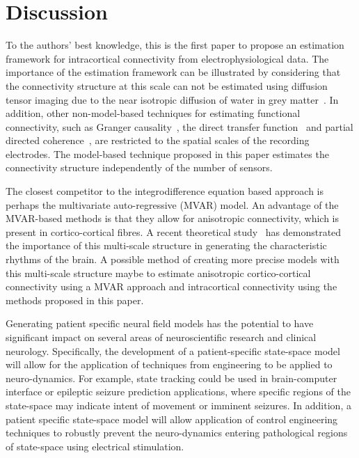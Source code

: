 \documentclass[10pt,a4paper]{article}
\begin{document}
\section{Discussion}\label{DiscussionSection}

To the authors' best knowledge, this is the first paper to propose an estimation framework for intracortical connectivity from electrophysiological data. The importance of the estimation framework can be illustrated by considering that the connectivity structure at this scale can not be estimated using diffusion tensor imaging due to the near isotropic diffusion of water in grey matter~\cite{Assaf2008}. In addition, other non-model-based techniques for estimating functional connectivity, such as Granger causality~\cite{Hesse2003}, the direct transfer function~\cite{Kaminski1991} and partial directed coherence~\cite{Sameshima1999}, are restricted to the spatial scales of the recording electrodes. The model-based technique proposed in this paper estimates the connectivity structure independently of the number of sensors. 

The closest competitor to the integrodifference equation based approach is perhaps the multivariate auto-regressive (MVAR) model. An advantage of the MVAR-based methods is that they allow for anisotropic connectivity, which is present in cortico-cortical fibres. A recent theoretical study~\cite{Jirsa2009} has demonstrated the importance of this multi-scale structure in generating the characteristic rhythms of the brain. A possible method of creating more precise models with this multi-scale structure maybe to estimate anisotropic cortico-cortical connectivity using a MVAR approach and intracortical connectivity using the methods proposed in this paper. 

Generating patient specific neural field models has the potential to have significant impact on several areas of neuroscientific research and clinical neurology. Specifically, the development of a patient-specific state-space model will allow for the application of techniques from engineering to be applied to neuro-dynamics. For example, state tracking could be used in brain-computer interface or epileptic seizure prediction applications, where specific regions of the state-space may indicate intent of movement or imminent seizures. In addition, a patient specific state-space model will allow application of control engineering techniques to robustly prevent the neuro-dynamics entering pathological regions of state-space using electrical stimulation. 
\end{document}
